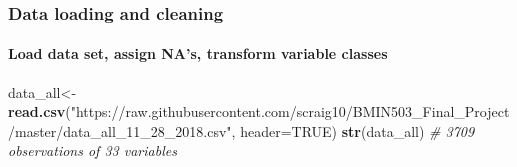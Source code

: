 \documentclass[]{article}
\newenvironment{Shaded}{\begin{snugshade}}{\end{snugshade}}
\newcommand{\KeywordTok}[1]{\textcolor[rgb]{0.13,0.29,0.53}{\textbf{#1}}}
\newcommand{\DataTypeTok}[1]{\textcolor[rgb]{0.13,0.29,0.53}{#1}}
\newcommand{\StringTok}[1]{\textcolor[rgb]{0.31,0.60,0.02}{#1}}
\newcommand{\CommentTok}[1]{\textcolor[rgb]{0.56,0.35,0.01}{\textit{#1}}}
\newcommand{\OtherTok}[1]{\textcolor[rgb]{0.56,0.35,0.01}{#1}}
\newcommand{\NormalTok}[1]{#1}
\let\oldparagraph\paragraph
\renewcommand{\paragraph}[1]{\oldparagraph{#1}\mbox{}}
\begin{document}
\subsubsection{Data loading and
cleaning}\label{data-loading-and-cleaning}

\paragraph{Load data set, assign NA's, transform variable
classes}\label{load-data-set-assign-nas-transform-variable-classes}

\begin{Shaded}
\begin{Highlighting}[]
\NormalTok{data_all<-}\StringTok{ }\KeywordTok{read.csv}\NormalTok{(}\StringTok{"https://raw.githubusercontent.com/scraig10/BMIN503_Final_Project/master/data_all_11_28_2018.csv"}\NormalTok{, }\DataTypeTok{header=}\OtherTok{TRUE}\NormalTok{)}
\KeywordTok{str}\NormalTok{(data_all) }\CommentTok{# 3709 observations of 33 variables}
\end{Highlighting}
\end{Shaded}
\end{document}
